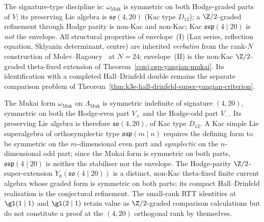 \begin{definition}
The signature-type discipline is: $\omega_{\mathrm{Muk}}$ is
symmetric on both Hodge-graded parts of $V$; its preserving Lie
algebra is $\mathfrak{so}(4, 20)$ (Kac type $D_{12}$); a
$\Z/2$-graded refinement through Hodge parity is non-Kac
and non-Kac; Kac $\mathfrak{osp}(4 \mid 20)$ is \emph{not} the
envelope. All structural properties of envelope~(I) (Lax series,
reflection equation, Sklyanin determinant, centre) are inherited
\emph{verbatim} from the rank-$N$ construction of
Molev--Ragoucy~\cite{MolevRagoucy2008} at $N = 24$; envelope~(II)
is the non-Kac $\Z/2$-graded theta-fixed extension of
Theorem~\ref{conj:osp-yangian-mukai}. Its identification with a
completed Hall--Drinfeld double remains the separate comparison
problem of Theorem~\ref{thm:k3e-hall-drinfeld-super-yangian-criterion}.
\end{definition}

\begin{remark}
\label{rem:gl-to-osp-correction}
The Mukai form $\omega_{\mathrm{Muk}}$ on $\Lambda_{\mathrm{Muk}}$ is
symmetric indefinite of signature $(4, 20)$, symmetric on both the
Hodge-even part $V_+$ and the Hodge-odd part $V_-$. Its preserving
Lie algebra is therefore $\mathfrak{so}(4, 20)$, of Kac type
$D_{12}$. A Kac simple Lie superalgebra of orthosymplectic type
$\mathfrak{osp}(m \mid n)$ requires the defining form to be symmetric
on the $m$-dimensional even part and \emph{symplectic} on the
$n$-dimensional odd part; since the Mukai form is symmetric on both
parts, $\mathfrak{osp}(4 \mid 20)$ is neither the stabiliser nor
the envelope. The Hodge-parity $\Z/2$-super-extension
$Y_\hbar(\mathfrak{so}(4 \mid 20))$ is a distinct, non-Kac
theta-fixed finite current algebra whose graded form is symmetric on
both parts; its compact Hall--Drinfeld realisation is the conjectural
refinement. The small-rank RTT identities at
$\gl(1 \mid 1)$ and $\gl(2 \mid 1)$ retain value as $\Z/2$-graded
comparison calculations but do not constitute a proof at the $(4, 20)$ orthogonal
rank by themselves.
\end{remark}

